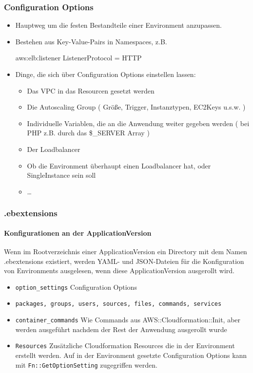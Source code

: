 \documentclass[aspectratio=169,grey,smaller]{beamer}
\begin{document}
\begin{frame}
  \frametitle{Configuration Options}
  \begin{itemize}
  \item<1-> Hauptweg um die festen Bestandteile einer Environment anzupassen.
  \item<2-> Bestehen aus Key-Value-Pairs in Namespaces, z.B.
  
  aws:elb:listener ListenerProtocol = HTTP
  \item<3-> Dinge, die sich über Configuration Options einstellen lassen:
    \begin{itemize}
    \item<4-> Das VPC in das Resourcen gesetzt werden
    \item<5-> Die Autoscaling Group ( Größe, Trigger, Instanztypen, EC2Keys u.s.w. )
    \item<6-> Individuelle Variablen, die an die Anwendung weiter gegeben werden ( bei PHP z.B. durch das \$\_SERVER Array )
    \item<7-> Der Loadbalancer
    \item<8-> Ob die Environment überhaupt einen Loadbalancer hat, oder SingleInstance sein soll
    \item<9-> \dots
    \end{itemize}
  \end{itemize}
\end{frame}

\begin{frame}
  \frametitle{.ebextensions}
  \framesubtitle{Konfigurationen an der ApplicationVersion}
  Wenn im Rootverzeichnis einer ApplicationVersion ein Directory mit dem Namen .ebextensions existiert, werden YAML- und JSON-Dateien für  die Konfiguration von Environments ausgelesen, wenn diese ApplicationVersion ausgerollt wird.
  
  \begin{itemize}
  \item<3-> \texttt{option\_settings} Configuration Options
  \item<4-> \texttt{packages, groups, users, sources, files, commands, services}
  \item<5-> \texttt{container\_commands} Wie Commands aus AWS::Cloudformation::Init, aber werden ausgeführt nachdem der Rest der Anwendung ausgerollt wurde
  \item<6-> \texttt{Resources} Zusätzliche Cloudformation Resources die in der Environment erstellt werden. Auf in der Environment gesetzte Configuration Options kann mit \texttt{Fn::GetOptionSetting} zugegriffen werden.
  \end{itemize}
\end{frame}
\end{document}
